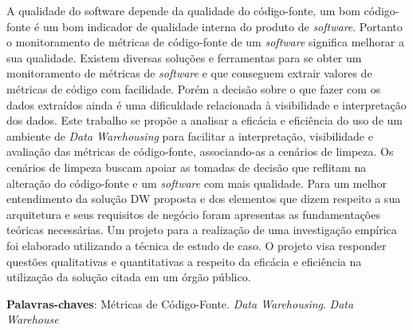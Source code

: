 \begin{resumo}




A qualidade do software depende da qualidade do código-fonte, um bom código-fonte é um bom indicador de
qualidade interna do produto de \textit{software}. Portanto o monitoramento de métricas de código-fonte de um \textit{software} significa melhorar a sua qualidade. Existem diversas soluções e ferramentas para se obter um monitoramento de métricas de \textit{software} e que conseguem extrair valores de métricas de código com facilidade. Porém a decisão sobre o que fazer com os dados extraídos ainda é uma
dificuldade relacionada à visibilidade e interpretação dos dados. Este trabalho se propõe a analisar a
eficácia e eficiência do uso de um ambiente de \textit{Data Warehousing} para facilitar a interpretação, visibilidade e avaliação das métricas de código-fonte, associando-as a cenários de limpeza. Os cenários de limpeza buscam apoiar as tomadas de decisão que reflitam na alteração do código-fonte e um \textit{software} com mais qualidade. Para um melhor entendimento da solução DW proposta e dos elementos que dizem respeito a sua arquitetura e seus requisitos de negócio foram apresentas as fundamentações teóricas necessárias. Um projeto para a realização de uma investigação empírica foi elaborado utilizando a técnica de estudo de caso. O projeto visa responder questões qualitativas e quantitativas a respeito da eficácia e eficiência na utilização da solução citada em um órgão público.
 
 

 \vspace{\onelineskip}
    
 \noindent
 \textbf{Palavras-chaves}: Métricas de Código-Fonte. \textit{Data Warehousing}. \textit{Data Warehouse}
\end{resumo}
